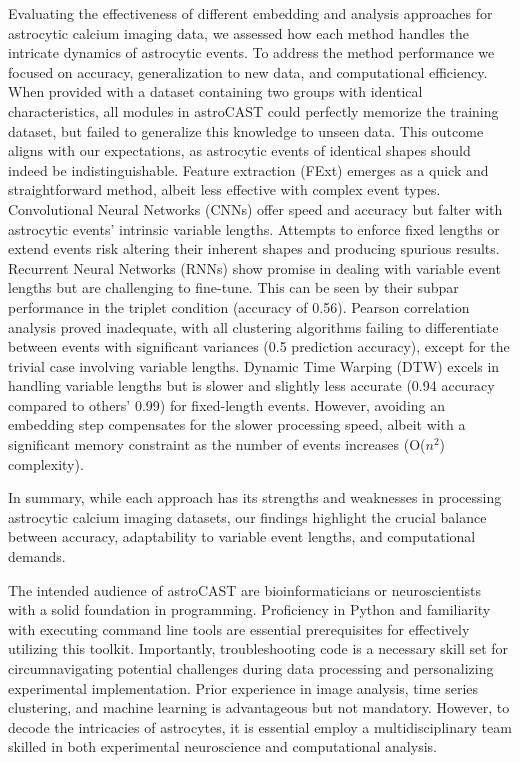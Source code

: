 Evaluating the effectiveness of different embedding and analysis approaches for astrocytic calcium imaging data, we assessed how each method handles the intricate dynamics of astrocytic events. To address the method performance we focused on accuracy, generalization to new data, and computational efficiency. When provided with a dataset containing two groups with identical characteristics, all modules in astroCAST could perfectly memorize the training dataset, but failed to generalize this knowledge to unseen data. This outcome aligns with our expectations, as astrocytic events of identical shapes should indeed be indistinguishable.
Feature extraction (FExt) emerges as a quick and straightforward method, albeit less effective with complex event types. Convolutional Neural Networks (CNNs) offer speed and accuracy but falter with astrocytic events' intrinsic variable lengths. Attempts to enforce fixed lengths or extend events risk altering their inherent shapes and producing spurious results. Recurrent Neural Networks (RNNs) show promise in dealing with variable event lengths but are challenging to fine-tune. This can be seen by their subpar performance in the triplet condition (accuracy of 0.56). Pearson correlation analysis proved inadequate, with all clustering algorithms failing to differentiate between events with significant variances (0.5 prediction accuracy), except for the trivial case involving variable lengths. Dynamic Time Warping (DTW) excels in handling variable lengths but is slower and slightly less accurate (0.94 accuracy compared to others' 0.99) for fixed-length events. However, avoiding an embedding step compensates for the slower processing speed, albeit with a significant memory constraint as the number of events increases (O($n^2$) complexity).

In summary, while each approach has its strengths and weaknesses in processing astrocytic calcium imaging datasets, our findings highlight the crucial balance between accuracy, adaptability to variable event lengths, and computational demands.

The intended audience of astroCAST are bioinformaticians or neuroscientists with a solid foundation in programming. Proficiency in Python and familiarity with executing command line tools are essential prerequisites for effectively utilizing this   toolkit. Importantly, troubleshooting code is a necessary skill set for circumnavigating potential challenges during data processing and personalizing experimental implementation. Prior experience in image analysis, time series clustering, and machine learning is advantageous but not mandatory. However, to decode the intricacies of astrocytes, it is essential employ a multidisciplinary team skilled in both experimental neuroscience and computational analysis.

